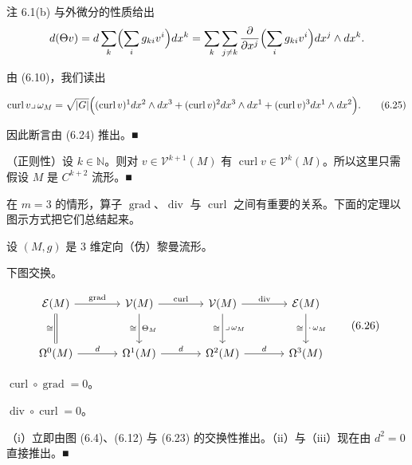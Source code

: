 \begin{remark}
\begin{items}
\proofhead
注 6.1(b) 与外微分的性质给出
\[
d(\Theta v) = d \sum_{k} \Bigl( \sum_{i} g_{ki} v^{i} \Bigr) dx^{k} = \sum_{k} \sum_{j \neq k} \frac{\partial}{\partial x^{j}} \Bigl( \sum_{i} g_{ki} v^{i} \Bigr) dx^{j} \wedge dx^{k} .
\]

由 (6.10)，我们读出

\begin{equation}
\operatorname{curl} v \lrcorner\, \omega_{M} = \sqrt{|G|} \Bigl( (\operatorname{curl} v)^{1} dx^{2} \wedge dx^{3} + (\operatorname{curl} v)^{2} dx^{3} \wedge dx^{1} + (\operatorname{curl} v)^{3} dx^{1} \wedge dx^{2} \Bigr) .\tag{6.25}
\end{equation}

因此断言由 (6.24) 推出。\nobreak\hspace{0.35em}■

\item

（正则性）设 $ k \in \mathbb{N} $。则对 $ v \in \mathcal{V}^{k+1}(M) $ 有 $ \operatorname{curl} v \in \mathcal{V}^{k}(M) $。所以这里只需假设 $ M $ 是 $ C^{k+2} $ 流形。\nobreak\hspace{0.35em}■

\end{items}

在 $ m = 3 $ 的情形，算子 $ \operatorname{grad} $、$ \operatorname{div} $ 与 $ \operatorname{curl} $ 之间有重要的关系。下面的定理以图示方式把它们总结起来。

\end{remark}

\begin{theorem}

设 $ (M, g) $ 是 3 维定向（伪）黎曼流形。

\begin{subitems}
\item

下图交换。

\[
\begin{tikzcd}[row sep=large, column sep=large] \mathcal{E}(M) \arrow[r, "\operatorname{grad}"] \arrow[d, equal, "\cong"'] & \mathcal{V}(M) \arrow[r, "\operatorname{curl}"] \arrow[d, "\Theta_{M}", "\cong"'] & \mathcal{V}(M) \arrow[r, "\operatorname{div}"] \arrow[d, "\lrcorner\,\omega_{M}", "\cong"'] & \mathcal{E}(M) \arrow[d, "\cdot\,\omega_{M}", "\cong"'] \\ \Omega^{0}(M) \arrow[r, "d"] & \Omega^{1}(M) \arrow[r, "d"] & \Omega^{2}(M) \arrow[r, "d"] & \Omega^{3}(M) \end{tikzcd} \tag{6.26}
\]
\item

$ \operatorname{curl} \circ \operatorname{grad} = 0 $。

\item

$ \operatorname{div} \circ \operatorname{curl} = 0 $。

\proofhead
（i）立即由图 (6.4)、(6.12) 与 (6.23) 的交换性推出。（ii）与（iii）现在由 $ d^{2} = 0 $ 直接推出。\nobreak\hspace{0.35em}■
\end{subitems}

\end{theorem}


